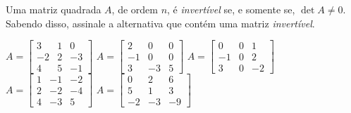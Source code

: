 Uma matriz quadrada $A$, de ordem $n$, é {\it invertível} se, e somente se, $\det A\neq 0$. Sabendo disso, assinale a alternativa que contém uma matriz {\it invertível}.

$A = \left[ \begin{array}{ccc} 3 & 1 & 0\\ -2 & 2 & -3\\ 4 &5 & -1 \end{array} \right]$
$A = \left[ \begin{array}{ccc}  2 &  0 & 0\\  -1 &  0 &  0\\  3 & -3 &  5 \end{array} \right]$
$A = \left[ \begin{array}{ccc} 0& 0 & 1\\ -1& 0 & 2\\ 3 & 0 & -2 \end{array} \right]$
$A = \left[ \begin{array}{ccc} 1 & -1 & -2\\ 2 & -2 & -4\\ 4 &-3 & 5 \end{array} \right]$
$A = \left[ \begin{array}{ccc}  0 &  2 &  6\\  5 &  1 &  3\\ -2 & -3 & -9 \end{array} \right]$








